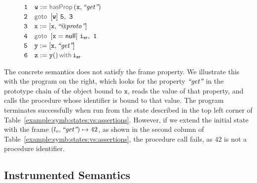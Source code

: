 \begin{figure}
\vspace*{-0.2cm}
{\footnotesize
\hspace*{-0.47cm} $\mathtt{1\quad w := \hasfield(x, \litstring{get})}$ \\[-0.08cm]
\hspace*{-0.47cm} $\mathtt{2\quad \ifgoto{w}{5}{3}}$ \\[-0.08cm]
\hspace*{-0.47cm} $\mathtt{3\quad x := [x, \text{{\it ``\ensuremath{\mathit{@proto}}''}}] }$ \\ [-0.08cm]
\hspace*{-0.47cm} $\mathtt{4\quad \ifgoto{x = \jnull}{\errlab}{1}}$ \\[-0.08cm]
\hspace*{-0.47cm} $\mathtt{5\quad y := [x, \text{{\it ``get''}}]}$ \\[-0.08cm]
\hspace*{-0.47cm} $\mathtt{6\quad \jsilcall{z}{y}{}{\errlab}}$ 
}
\vspace*{-0.2cm}
\end{figure}




The \jsil concrete semantics does not satisfy the frame property. 
We illustrate this with the program on the right, which 
looks for the property $\text{{\it ``get''}}$ in the 
prototype chain of the object bound to $\mathtt{x}$, reads the value of that 
property, and calls the procedure whose identifier is bound to that value. 
The program terminates successfully when run from the state 
described in the top left corner of Table~\ref{example:symb:states:vs:assertions}. However, if we extend the initial state with the frame $(l_o, \text{{\it ``get''}}) \mapsto 42$, 
as shown in the second column of Table~\ref{example:symb:states:vs:assertions}, the procedure 
call fails, as $42$ is not a procedure identifier. 

\vspace*{-0.2cm}
\subsection{\jsil Instrumented Semantics}\label{subsec:instrumented}



